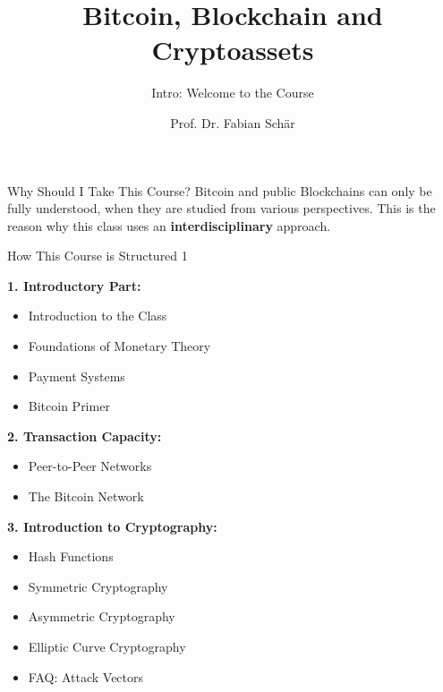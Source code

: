 \documentclass[]{beamer}
\title{Bitcoin, Blockchain and Cryptoassets}
\subtitle{Intro: Welcome to the Course}
\author{Prof. Dr. Fabian Schär}
\institute{University of Basel}
\begin{document}
\thispagestyle{empty}
\begin{frame}[noframenumbering]
	\titlepage
\end{frame}

\begin{frame}{Why Should I Take This Course?}
	\uncover<1->{
		\begin{figure}[h]
  			\center
			
		\end{figure}
	}
	\vspace{1em}
Bitcoin and public Blockchains can only be fully understood, when they are studied from various perspectives. This is the reason why this class uses an \color{focus} \textbf{interdisciplinary} \color{black} approach.	
\end{frame}

\begin{frame}{How This Course is Structured 1}
\footnotesize

\textbf{1. Introductory Part:}
	\begin{itemize}
		\item Introduction to the Class
		\item Foundations of Monetary Theory
		\item Payment Systems
		\item Bitcoin Primer
	\end{itemize}
	
\vspace{0.5em}

\textbf{2. Transaction Capacity:}
	\begin{itemize}
		\item Peer-to-Peer Networks
		\item The Bitcoin Network
	\end{itemize}

\vspace{0.5em}	
	
\textbf{3. Introduction to Cryptography:}
	\begin{itemize}
		\item Hash Functions
		\item Symmetric Cryptography
		\item Asymmetric Cryptography
		\item Elliptic Curve Cryptography
		\item FAQ: Attack Vectors
	\end{itemize}
	
\end{frame}
\end{document}
